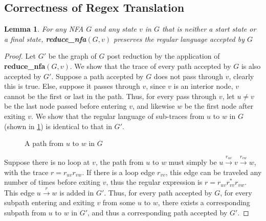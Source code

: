 \documentclass[conference]{IEEEtran}
\newtheorem{lemma}{Lemma}[section]
\theoremstyle{definition}
\theoremstyle{remark}
\begin{document}
\subsection{Correctness of Regex Translation}
\begin{lemma}
    For any NFA $G$ and any state $v$ in $G$ that is neither a start state or a final state, \textbf{reduce\_nfa}$(G, v)$ preserves the regular language accepted by $G$
\end{lemma}
\begin{proof}
    Let $G'$ be the graph of $G$ post reduction by the application of \textbf{reduce\_nfa}$(G, v)$. We show that the trace of every path accepted by $G$ is also accepted by $G'$. Suppose a path accepted by $G$ does not pass through $v$, clearly this is true. Else, suppose it passes through $v$, since $v$ is an interior node, $v$ cannot be the first or last in the path. Thus, for every pass through $v$, let $u\neq v$ be the last node passed before entering $v$, and likewise $w$ be the first node after exiting $v$. We show that the regular language of sub-traces from $u$ to $w$ in $G$ (shown in \cref{fig:uvw-dfa}) is identical to that in $G'$.
    \begin{figure}[h!]
        \centering
        \caption{A path from $u$ to $w$ in $G$}
        \label{fig:uvw-dfa}
    \end{figure}
    Suppose there is no loop at $v$, the path from $u$ to $w$ must simply be $u\xrightarrow{r_{uv}}v\xrightarrow{r_{vw}}w$, with the trace $r=r_{uv}r_{vw}$. If there is a loop edge $r_{vv}$, this edge can be traveled any number of times before exiting $v$, thus the regular expression is $r=r_{uv}r_{vv}^*r_{vw}$. This edge $u\xrightarrow{r}w$ is added in $G'$. Thus, for every path accepted by $G$, for every subpath entering and exiting $v$ from some $u$ to $w$, there exists a corresponding subpath from $u$ to $w$ in $G'$, and thus a corresponding path accepted by $G'$.
\end{proof}
\end{document}
